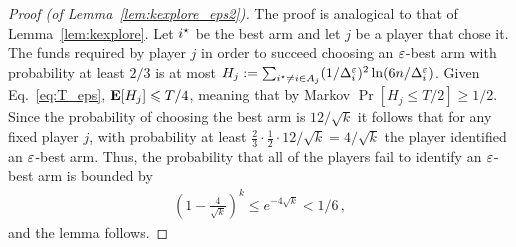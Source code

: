 \documentclass[12pt]{article}
\begin{document}
\begin{proof}[Proof (of Lemma~\ref{lem:kexplore_eps2})]
The proof is analogical to that of Lemma~\ref{lem:kexplore}.
Let $i^\star$ be the best arm and let $j$ be a player that chose it. The funds required by player $j$ in order to succeed choosing an $\varepsilon$-best arm with probability at least $2/3$ is at most
$
	H_j	:= \sum_{i^\star \ne i \in A_j}
		(1/\Delta_i^{\varepsilon})^2 \ln (6n/\Delta_i^{\varepsilon})
$.
Given Eq.~\eqref{eq:T_eps}, $\mathbf{E}[H_j] \leqslant T/4$, meaning that by Markov $\Pr[H_j \le T/2] \geq 1/2$. Since the probability of choosing the best arm is $12/\sqrt{k}$ it follows that for any fixed player $j$, with probability at least $\tfrac{2}{3} \cdot \tfrac{1}{2} \cdot 12/\sqrt{k} = 4/\sqrt{k}$ the player identified an $\varepsilon$-best arm.
Thus, the probability that all of the players fail to identify an $\varepsilon$-best arm is bounded by
\begin{align*}
	\left( 1- \tfrac{4}{\sqrt{k}} \right)^k
	\le e^{-4\sqrt{k}}
	< 1/6 \,,
\end{align*}
and the lemma follows.
\end{proof}
\end{document}
